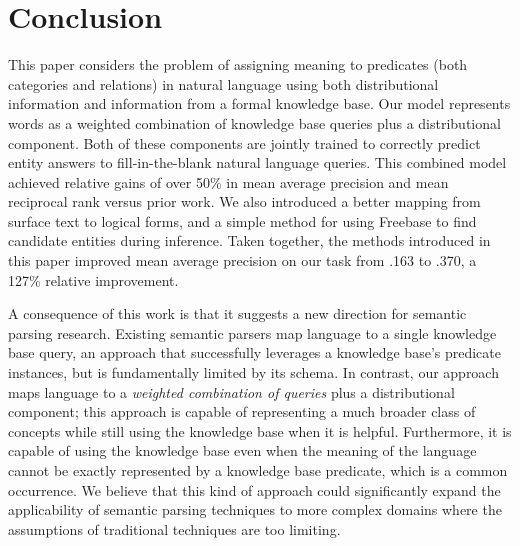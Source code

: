 \documentclass[11pt]{article}
\begin{document}
\section{Conclusion}
\label{sec:conclusion}

This paper considers the problem of assigning meaning to predicates
(both categories and relations) in natural language using both
distributional information and information from a formal knowledge
base. Our model represents words as a weighted combination of
knowledge base queries plus a distributional component. Both of these
components are jointly trained to correctly predict entity answers to
fill-in-the-blank natural language queries. This combined model
achieved relative gains of over 50\% in mean average precision and
mean reciprocal rank versus prior work.  We also introduced a better
mapping from surface text to logical forms, and a simple method for
using Freebase to find candidate entities during inference.  Taken
together, the methods introduced in this paper improved mean average
precision on our task from .163 to .370, a 127\% relative improvement.

A consequence of this work is that it suggests a new direction for
semantic parsing research. Existing semantic parsers map language to a
single knowledge base query, an approach that successfully leverages a
knowledge base's predicate instances, but is fundamentally limited by
its schema. In contrast, our approach maps language to a
\emph{weighted combination of queries} plus a distributional
component; this approach is capable of representing a much broader
class of concepts while still using the knowledge base when it is
helpful. Furthermore, it is capable of using the knowledge base even
when the meaning of the language cannot be exactly represented by a
knowledge base predicate, which is a common occurrence. We believe
that this kind of approach could significantly expand the
applicability of semantic parsing techniques to more complex domains
where the assumptions of traditional techniques are too limiting.




\end{document}
